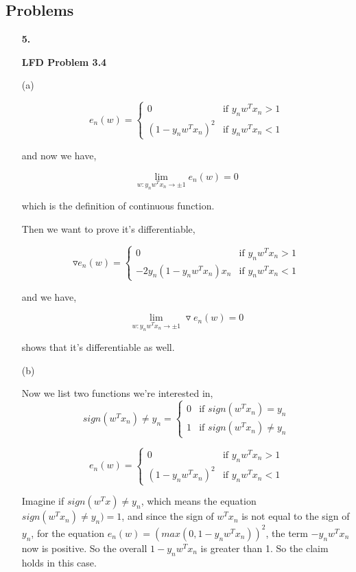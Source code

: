 \documentclass[11pt]{article}
\begin{document}
\begin{enumerate}
\end{enumerate}
\pagebreak
\subsection*{Problems}
\begin{enumerate}

\item[\textbf{5.}]

\textbf{LFD Problem 3.4}

(a)

\[
e_{n}(w)
= \begin{cases}
0 & \text{if $y_nw^Tx_n > 1$}\\
(1 - y_nw^Tx_n)^2 & \text{if $y_nw^Tx_n < 1$}
\end{cases}
\]

and now we have, 

$$\lim_{w:y_nw^Tx_n \rightarrow \pm 1} e_n(w) = 0$$

which is the definition of continuous function.

Then we want to prove it's differentiable, 

\[
\triangledown e_n(w)
=\begin{cases}
0 & \text{if $y_nw^Tx_n > 1$}\\
-2y_n(1 - y_nw^Tx_n)x_n & \text{if $y_nw^Tx_n < 1$}
\end{cases}
\]

and we have, 

$$ \lim_{w:y_nw^Tx_n \rightarrow \pm 1} \triangledown e_n(w) = 0$$

shows that it's differentiable as well.


(b)

Now we list two functions we're interested in, 
\[
sign(w^Tx_n) \neq y_n 
= \begin{cases}
0 & \text{if $sign(w^Tx_n) = y_n$}\\
1 & \text{if $sign(w^Tx_n) \neq y_n$}
\end{cases}
\]

\[
e_{n}(w)
= \begin{cases}
0 & \text{if $y_nw^Tx_n > 1$}\\
(1 - y_nw^Tx_n)^2 & \text{if $y_nw^Tx_n < 1$}
\end{cases}
\]

Imagine if $sign(w^Tx) \neq y_n$, which means the equation $sign(w^Tx_n) \neq y_n) = 1$, and since the sign of $w^Tx_n$ is not equal to the sign of $y_n$, for the equation $e_{n}(w) = (max(0, 1-y_nw^Tx_n))^2$, the term $-y_nw^Tx_n$ now is positive. So the overall $1-y_nw^Tx_n$ is greater than 1. So the claim holds in this case.


\end{enumerate}
\end{document}

